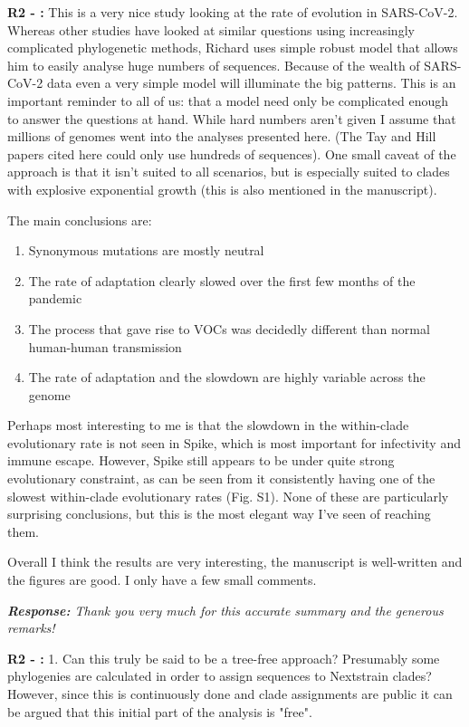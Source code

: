 \documentclass[aps,rmp,onecolumn]{revtex4-1}
\newcounter{counter1}[section]
\newcounter{counter2}[section]
\newcounter{counter3}[section]
\newcommand{\refb}[1]{\vskip 5mm \textbf{R2 - \stepcounter{counter2}\arabic{counter2}:} #1}
\newcommand{\response}[1]{{\it {\color{response}\textbf{Response:} #1}}\vskip 5mm}
\begin{document}
\refb{
This is a very nice study looking at the rate of evolution in SARS-CoV-2. Whereas other studies have looked at similar questions using increasingly complicated phylogenetic methods, Richard uses simple robust model that allows him to easily analyse huge numbers of sequences. Because of the wealth of SARS-CoV-2 data even a very simple model will illuminate the big patterns. This is an important reminder to all of us: that a model need only be complicated enough to answer the questions at hand. While hard numbers aren't given I assume that millions of genomes went into the analyses presented here. (The Tay and Hill papers cited here could only use hundreds of sequences). One small caveat of the approach is that it isn't suited to all scenarios, but is especially suited to clades with explosive exponential growth (this is also mentioned in the manuscript).

The main conclusions are:
\begin{enumerate}
 \item Synonymous mutations are mostly neutral
 \item The rate of adaptation clearly slowed over the first few months of the pandemic
 \item The process that gave rise to VOCs was decidedly different than normal human-human transmission
 \item The rate of adaptation and the slowdown are highly variable across the genome
\end{enumerate}
Perhaps most interesting to me is that the slowdown in the within-clade evolutionary rate is not seen in Spike, which is most important for infectivity and immune escape. However, Spike still appears to be under quite strong evolutionary constraint, as can be seen from it consistently having one of the slowest within-clade evolutionary rates (Fig. S1). None of these are particularly surprising conclusions, but this is the most elegant way I've seen of reaching them.

Overall I think the results are very interesting, the manuscript is well-written and the figures are good. I only have a few small comments.}

\response{Thank you very much for this accurate summary and the generous remarks!}

\refb{1. Can this truly be said to be a tree-free approach? Presumably some phylogenies are calculated in order to assign sequences to Nextstrain clades? However, since this is continuously done and clade assignments are public it can be argued that this initial part of the analysis is "free".}
\end{document}
